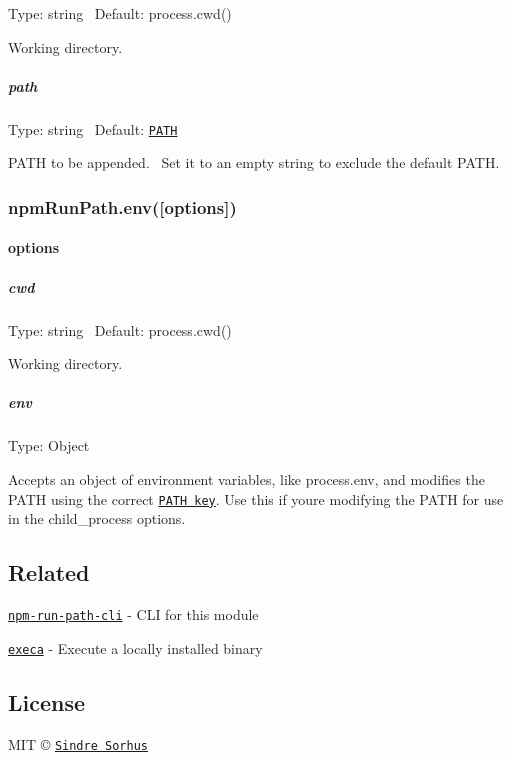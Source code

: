 Type\+: {\ttfamily string}~\newline
 Default\+: {\ttfamily process.\+cwd()}

Working directory.

\subparagraph*{path}

Type\+: {\ttfamily string}~\newline
 Default\+: \href{https://github.com/sindresorhus/path-key}{\tt {\ttfamily P\+A\+TH}}

P\+A\+TH to be appended.~\newline
 Set it to an empty string to exclude the default P\+A\+TH.

\subsubsection*{npm\+Run\+Path.\+env(\mbox{[}options\mbox{]})}

\paragraph*{options}

\subparagraph*{cwd}

Type\+: {\ttfamily string}~\newline
 Default\+: {\ttfamily process.\+cwd()}

Working directory.

\subparagraph*{env}

Type\+: {\ttfamily Object}

Accepts an object of environment variables, like {\ttfamily process.\+env}, and modifies the P\+A\+TH using the correct \href{https://github.com/sindresorhus/path-key}{\tt P\+A\+TH key}. Use this if you\textquotesingle{}re modifying the P\+A\+TH for use in the {\ttfamily child\+\_\+process} options.

\subsection*{Related}


\begin{DoxyItemize}
\item \href{https://github.com/sindresorhus/npm-run-path-cli}{\tt npm-\/run-\/path-\/cli} -\/ C\+LI for this module
\item \href{https://github.com/sindresorhus/execa}{\tt execa} -\/ Execute a locally installed binary
\end{DoxyItemize}

\subsection*{License}

M\+IT © \href{https://sindresorhus.com}{\tt Sindre Sorhus} 